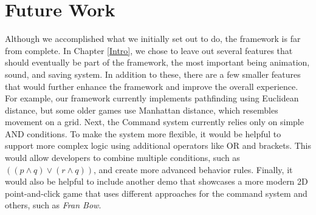 \section{Future Work}
Although we accomplished what we initially set out to do, the framework is far from complete. In Chapter \ref{Intro}, we chose to leave out several features that should eventually be part of the framework, the most important being animation, sound, and saving system. In addition to these, there are a few smaller features that would further enhance the framework and improve the overall experience. For example, our framework currently implements pathfinding using Euclidean distance, but some older games use Manhattan distance, which resembles movement on a grid. Next, the Command system currently relies only on simple AND conditions. To make the system more flexible, it would be helpful to support more complex logic using additional operators like OR and brackets. This would allow developers to combine multiple conditions, such as $((p \wedge q) \vee (r \wedge q))$, and create more advanced behavior rules.  Finally, it would also be helpful to include another demo that showcases a more modern 2D point-and-click game that uses different approaches for the command system and others, such as \textit{Fran Bow}. 
